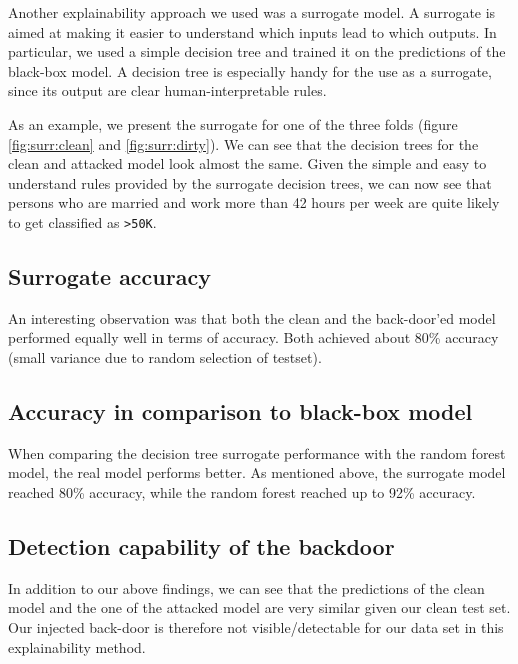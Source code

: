 \documentclass[sigconf,nonacm]{acmart}
\begin{document}
Another explainability approach we used was a surrogate model. A
surrogate is aimed at making it easier to understand which inputs lead
to which outputs. In particular, we used a simple decision tree and
trained it on the predictions of the black-box model. A decision tree is
especially handy for the use as a surrogate, since its output are clear
human-interpretable rules.

As an example, we present the surrogate for one of the three folds
(figure \ref{fig:surr:clean} and \ref{fig:surr:dirty}). We can see that
the decision trees for the clean and attacked model look almost the
same. Given the simple and easy to understand rules provided by the
surrogate decision trees, we can now see that persons who are married
and work more than 42 hours per week are quite likely to get classified
as \texttt{\textgreater{}50K}.

\hypertarget{surrogate-accuracy}{%
\subsection{Surrogate accuracy}\label{surrogate-accuracy}}

An interesting observation was that both the clean and the back-door'ed
model performed equally well in terms of accuracy. Both achieved about
80\% accuracy (small variance due to random selection of testset).

\hypertarget{accuracy-in-comparison-to-black-box-model}{%
\subsection{Accuracy in comparison to black-box
model}\label{accuracy-in-comparison-to-black-box-model}}

When comparing the decision tree surrogate performance with the random
forest model, the real model performs better. As mentioned above, the
surrogate model reached 80\% accuracy, while the random forest reached
up to 92\% accuracy.

\hypertarget{detection-capability-of-the-backdoor}{%
\subsection{Detection capability of the
backdoor}\label{detection-capability-of-the-backdoor}}

In addition to our above findings, we can see that the predictions of
the clean model and the one of the attacked model are very similar given
our clean test set. Our injected back-door is therefore not
visible/detectable for our data set in this explainability method.
\end{document}

